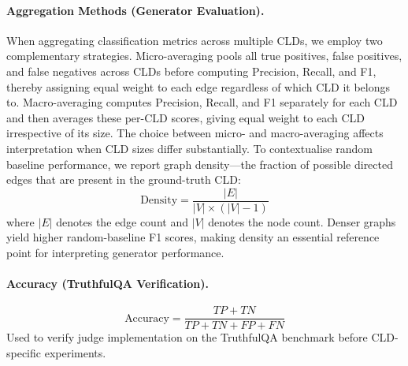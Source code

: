 \paragraph{Aggregation Methods (Generator Evaluation).}
When aggregating classification metrics across multiple CLDs, we employ two complementary strategies. Micro-averaging pools all true positives, false positives, and false negatives across CLDs before computing Precision, Recall, and F1, thereby assigning equal weight to each edge regardless of which CLD it belongs to. Macro-averaging computes Precision, Recall, and F1 separately for each CLD and then averages these per-CLD scores, giving equal weight to each CLD irrespective of its size. The choice between micro- and macro-averaging affects interpretation when CLD sizes differ substantially. To contextualise random baseline performance, we report graph density---the fraction of possible directed edges that are present in the ground-truth CLD:
\begin{equation}
    \text{Density} = \frac{|E|}{|V| \times (|V| - 1)}
\end{equation}
where $|E|$ denotes the edge count and $|V|$ denotes the node count. Denser graphs yield higher random-baseline F1 scores, making density an essential reference point for interpreting generator performance.

\paragraph{Accuracy (TruthfulQA Verification).}
\begin{equation}
    \text{Accuracy} = \frac{TP + TN}{TP + TN + FP + FN}
\end{equation}
Used to verify judge implementation on the TruthfulQA benchmark before CLD-specific experiments.

